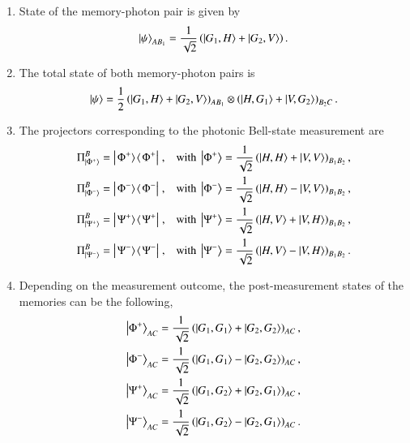 \begin{solution}
\begin{enumerate}[label=(\alph*)]
    \item State of the memory-photon pair is given by
    \begin{equation*}
        \left| \psi \right\rangle_{AB_1} = \frac{1}{\sqrt{2}} \left( \left| G_1,H \right\rangle + \left| G_2,V \right\rangle \right).
    \end{equation*}
    \item The total state of both memory-photon pairs is
    \begin{equation*}
        \left| \psi \right\rangle = \frac{1}{2} \left( \left| G_1,H \right\rangle + \left| G_2,V \right\rangle \right)_{AB_1} \otimes \left( \left| H, G_1 \right\rangle + \left| V, G_2 \right\rangle \right)_{B_2C}.
    \end{equation*}
    \item The projectors corresponding to the photonic Bell-state measurement are
    \begin{align*}
        \Pi^B_{\left| \Phi^+ \right\rangle} & = \left|\left. \Phi^+ \rangle\right.\!\langle\left. \Phi^+ \right|\right. , & \text{with } \left| \Phi^+ \right\rangle = \frac{1}{\sqrt{2}} \left( \left| H,H \right\rangle + \left| V,V \right\rangle \right)_{B_1B_2}, \\
        \Pi^B_{\left| \Phi^- \right\rangle} & = \left|\left. \Phi^- \rangle\right.\!\langle\left. \Phi^- \right|\right. , & \text{with } \left| \Phi^- \right\rangle = \frac{1}{\sqrt{2}} \left( \left| H,H \right\rangle - \left| V,V \right\rangle \right)_{B_1B_2}, \\
        \Pi^B_{\left| \Psi^+ \right\rangle} & = \left|\left. \Psi^+ \rangle\right.\!\langle\left. \Psi^+ \right|\right. , & \text{with } \left| \Psi^+ \right\rangle = \frac{1}{\sqrt{2}} \left( \left| H,V \right\rangle + \left| V,H \right\rangle \right)_{B_1B_2}, \\
        \Pi^B_{\left| \Psi^- \right\rangle} & = \left|\left. \Psi^- \rangle\right.\!\langle\left. \Psi^- \right|\right. , & \text{with } \left| \Psi^- \right\rangle = \frac{1}{\sqrt{2}} \left( \left| H,V \right\rangle - \left| V,H \right\rangle \right)_{B_1B_2}.
    \end{align*}
    \item Depending on the measurement outcome, the post-measurement states of the memories can be the following,
    \begin{align*}
        \left| \Phi^+ \right\rangle_{AC} & = \frac{1}{\sqrt{2}} \left( \left| G_1,G_1 \right\rangle + \left| G_2,G_2 \right\rangle \right)_{AC}, \\
        \left| \Phi^- \right\rangle_{AC} & = \frac{1}{\sqrt{2}} \left( \left| G_1,G_1 \right\rangle - \left| G_2,G_2 \right\rangle \right)_{AC}, \\
        \left| \Psi^+ \right\rangle_{AC} & = \frac{1}{\sqrt{2}} \left( \left| G_1,G_2 \right\rangle + \left| G_2,G_1 \right\rangle \right)_{AC}, \\
        \left| \Psi^- \right\rangle_{AC} & = \frac{1}{\sqrt{2}} \left( \left| G_1,G_2 \right\rangle - \left| G_2,G_1 \right\rangle \right)_{AC}.
    \end{align*}
\end{enumerate}
\end{solution}

